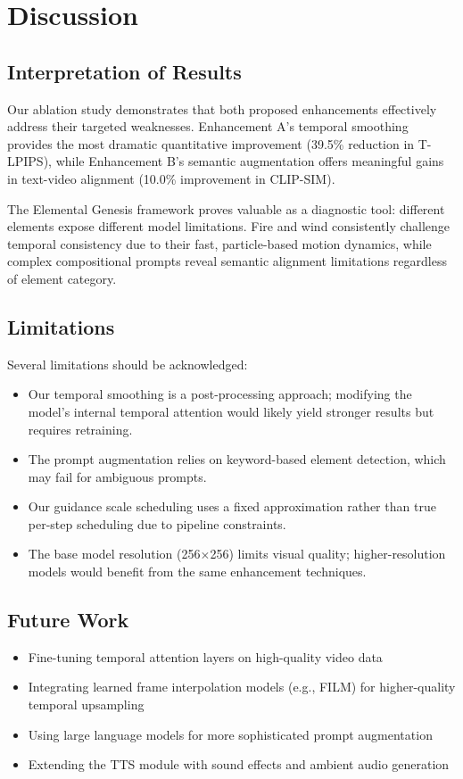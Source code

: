 \documentclass[conference]{IEEEtran}
\begin{document}
\section{Discussion}

\subsection{Interpretation of Results}

Our ablation study demonstrates that both proposed enhancements effectively address their targeted weaknesses. Enhancement A's temporal smoothing provides the most dramatic quantitative improvement (39.5\% reduction in T-LPIPS), while Enhancement B's semantic augmentation offers meaningful gains in text-video alignment (10.0\% improvement in CLIP-SIM).

The Elemental Genesis framework proves valuable as a diagnostic tool: different elements expose different model limitations. Fire and wind consistently challenge temporal consistency due to their fast, particle-based motion dynamics, while complex compositional prompts reveal semantic alignment limitations regardless of element category.

\subsection{Limitations}

Several limitations should be acknowledged:
\begin{itemize}
    \item Our temporal smoothing is a post-processing approach; modifying the model's internal temporal attention would likely yield stronger results but requires retraining.
    \item The prompt augmentation relies on keyword-based element detection, which may fail for ambiguous prompts.
    \item Our guidance scale scheduling uses a fixed approximation rather than true per-step scheduling due to pipeline constraints.
    \item The base model resolution (256$\times$256) limits visual quality; higher-resolution models would benefit from the same enhancement techniques.
\end{itemize}

\subsection{Future Work}
\begin{itemize}
    \item Fine-tuning temporal attention layers on high-quality video data
    \item Integrating learned frame interpolation models (e.g., FILM) for higher-quality temporal upsampling
    \item Using large language models for more sophisticated prompt augmentation
    \item Extending the TTS module with sound effects and ambient audio generation
\end{itemize}
\end{document}
